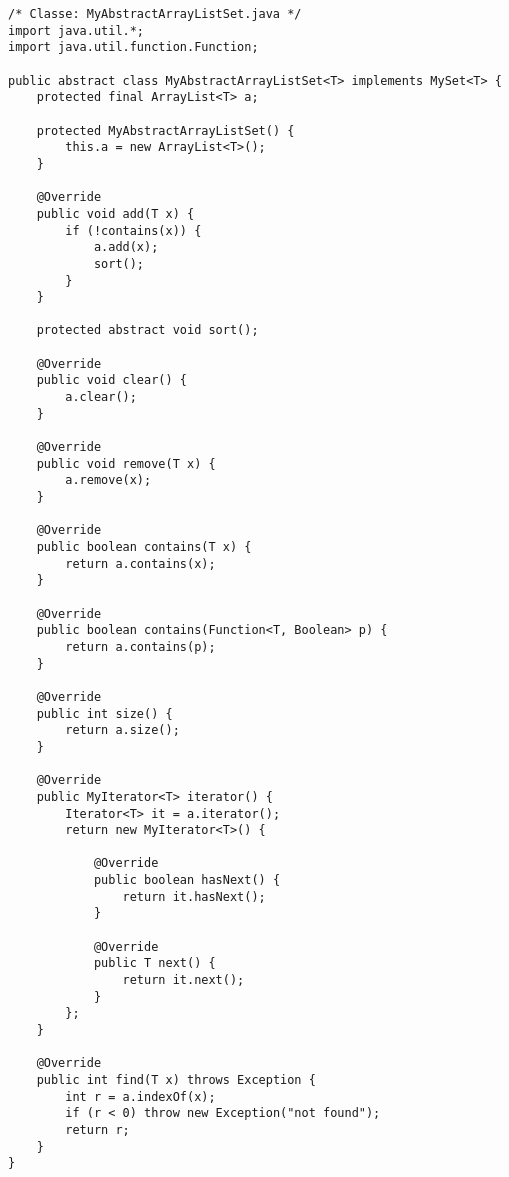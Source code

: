 \begin{lstlisting}[basicstyle=\small,]
/* Classe: MyAbstractArrayListSet.java */
import java.util.*;
import java.util.function.Function;

public abstract class MyAbstractArrayListSet<T> implements MySet<T> {
    protected final ArrayList<T> a;

    protected MyAbstractArrayListSet() {
        this.a = new ArrayList<T>();
    }

    @Override
    public void add(T x) {
        if (!contains(x)) {
            a.add(x);
            sort();
        }
    }

    protected abstract void sort();

    @Override
    public void clear() {
        a.clear();
    }

    @Override
    public void remove(T x) {
        a.remove(x);
    }

    @Override
    public boolean contains(T x) {
        return a.contains(x);
    }

    @Override
    public boolean contains(Function<T, Boolean> p) {
        return a.contains(p);
    }

    @Override
    public int size() {
        return a.size();
    }

    @Override
    public MyIterator<T> iterator() {
        Iterator<T> it = a.iterator();
        return new MyIterator<T>() {

            @Override
            public boolean hasNext() {
                return it.hasNext();
            }

            @Override
            public T next() {
                return it.next();
            }
        };
    }

    @Override
    public int find(T x) throws Exception {
        int r = a.indexOf(x);
        if (r < 0) throw new Exception("not found");
        return r;
    }
}

\end{lstlisting}

